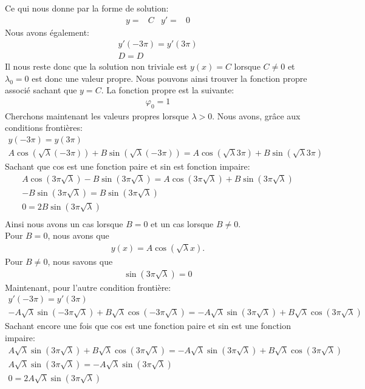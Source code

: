 \documentclass{article}
\begin{document}
Ce qui nous donne par la forme de solution:
\begin{align*}
    y=&C & y'=&0
\end{align*}
Nous avons également:
\begin{gather*}
    y'(-3\pi)=y'(3\pi)\\
    D=D
\end{gather*}
Il nous reste donc que la solution non triviale est $y(x)=C$ lorsque $C\neq0$ et $\lambda_0=0$ est donc une valeur propre. Nous pouvons ainsi trouver la fonction propre associé sachant que $y=C$. La fonction propre est la suivante:
\begin{gather*}
    \varphi_0=1
\end{gather*}
Cherchons maintenant les valeurs propres lorsque $\lambda>0$. Nous avons, grâce aux conditions frontières:
\begin{gather*}
    y(-3\pi)=y(3\pi)\\
    A\cos(\sqrt{\lambda}(-3\pi))+B\sin(\sqrt{\lambda}(-3\pi))=A\cos(\sqrt{\lambda}3\pi)+B\sin(\sqrt{\lambda}3\pi)
\end{gather*}
Sachant que cos est une fonction paire et sin est fonction impaire:
\begin{gather*}
    A\cos(3\pi\sqrt{\lambda})-B\sin(3\pi\sqrt{\lambda})=A\cos(3\pi\sqrt{\lambda})+B\sin(3\pi\sqrt{\lambda})\\
    -B\sin(3\pi\sqrt{\lambda})=B\sin(3\pi\sqrt{\lambda})\\
    0=2B\sin(3\pi\sqrt{\lambda})\\
\end{gather*}
Ainsi nous avons un cas lorsque $B=0$ et un cas lorsque $B\neq0$.\\
Pour $B=0$, nous avons que
\begin{gather*}
    y(x)=A\cos(\sqrt{\lambda}x).
\end{gather*}
Pour $B\neq0$, nous savons que
\begin{gather*}
    \sin(3\pi\sqrt{\lambda})=0
\end{gather*}
Maintenant, pour l'autre condition frontière:
\begin{gather*}
    y'(-3\pi)=y'(3\pi)\\
    -A\sqrt{\lambda}\sin(-3\pi\sqrt{\lambda})+B\sqrt{\lambda}\cos(-3\pi\sqrt{\lambda})=-A\sqrt{\lambda}\sin(3\pi\sqrt{\lambda})+B\sqrt{\lambda}\cos(3\pi\sqrt{\lambda})
\end{gather*}
Sachant encore une fois que cos est une fonction paire et sin est une fonction impaire:
\begin{gather*}
    A\sqrt{\lambda}\sin(3\pi\sqrt{\lambda})+B\sqrt{\lambda}\cos(3\pi\sqrt{\lambda})=-A\sqrt{\lambda}\sin(3\pi\sqrt{\lambda})+B\sqrt{\lambda}\cos(3\pi\sqrt{\lambda})\\
    A\sqrt{\lambda}\sin(3\pi\sqrt{\lambda})=-A\sqrt{\lambda}\sin(3\pi\sqrt{\lambda})\\
    0=2A\sqrt{\lambda}\sin(3\pi\sqrt{\lambda})\\
\end{gather*}
\end{document}
